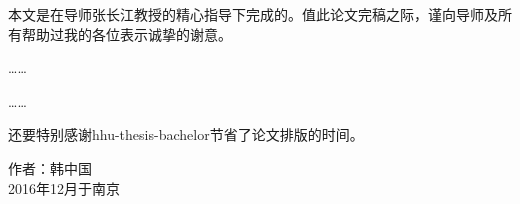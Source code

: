 
\begin{acknowledgement}

本文是在导师张长江教授的精心指导下完成的。值此论文完稿之际，谨向导师及所有帮助过我的各位表示诚挚的谢意。\par
……\par
……\par
还要特别感谢hhu-thesis-bachelor节省了论文排版的时间。
\vspace{5cm}
\begin{flushright}
	作者：韩中国\\
	2016年12月于南京
\end{flushright}

\end{acknowledgement}
